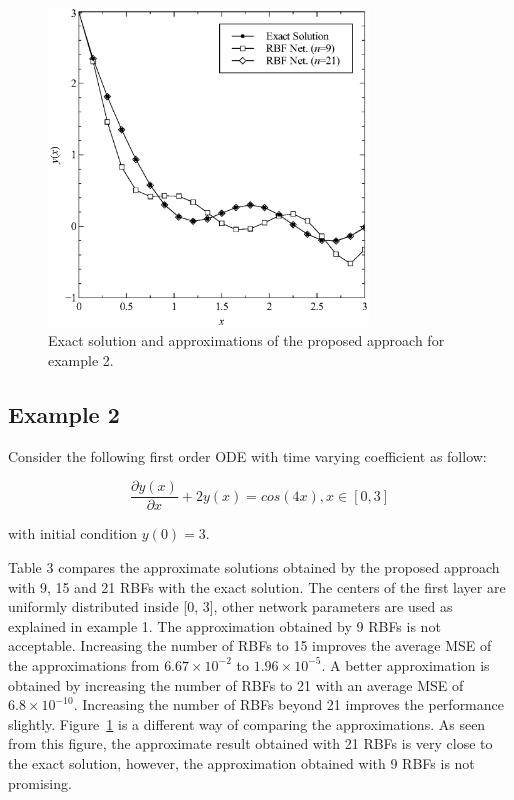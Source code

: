 \documentclass{mc}
\begin{document}
\begin{figure}
\centering
\includegraphics[width=8.5cm]{Fig3.eps}
\caption{Exact solution and approximations of the proposed approach for example 2.}
\label{fig3}
\end{figure}

\subsection{Example 2}

Consider the following first order ODE with time varying coefficient as follow:

\begin{equation}
\frac{\partial y(x)}{\partial x}+2y(x)=cos(4x), x \in [0 , 3]
\end{equation}

with initial condition $y(0)=3$.

Table 3 compares the approximate solutions obtained by the proposed approach with 9, 15 and 21 RBFs with the exact solution. The centers of the first layer are uniformly distributed inside [0, 3], other network parameters are used as explained in example 1. The approximation obtained by 9 RBFs is not acceptable. Increasing the number of RBFs to 15 improves the average MSE of the approximations from $6.67\times10^{-2}$ to $1.96\times10^{-5}$. A better approximation is obtained by increasing the number of RBFs to 21 with an average MSE of $6.8\times10^{-10}$. Increasing the number of RBFs beyond 21 improves the performance slightly. Figure~\ref{fig3} is a different way of comparing the approximations. As seen from this figure, the approximate result obtained with 21 RBFs is very close to the exact solution, however, the approximation obtained with 9 RBFs is not promising.
\end{document}
